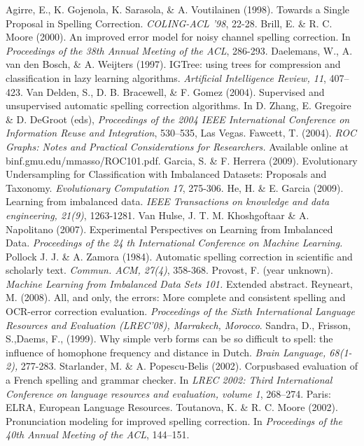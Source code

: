 \documentclass[12pt]{article}
\begin{document}
\begin{thebibliography}{99}

Agirre, E., K. Gojenola, K. Sarasola, \& A. Voutilainen (1998). Towards a Single Proposal in Spelling Correction. \emph{COLING-ACL ’98},  22-28.
Brill, E. \& R. C. Moore (2000). An improved error model for noisy channel spelling correction. In \emph{Proceedings of the 38th Annual Meeting of the ACL}, 286-293.
Daelemans, W., A. van den Bosch, \& A. Weijters (1997). IGTree: using trees for compression and classification in lazy learning algorithms. \emph{Artificial Intelligence Review, 11}, 407–423.
Van Delden, S., D. B. Bracewell, \& F. Gomez (2004). Supervised and unsupervised automatic spelling correction algorithms. In D. Zhang, E. Gregoire \& D. DeGroot (eds), \emph{Proceedings of the 2004 IEEE International Conference on Information Reuse and Integration}, 530–535, Las Vegas.
Fawcett, T. (2004). \emph{ROC Graphs: Notes and Practical Considerations for Researchers.} Available online at binf.gmu.edu/mmasso/ROC101.pdf.
Garcia, S. \& F. Herrera (2009). Evolutionary Undersampling for Classification with Imbalanced Datasets: Proposals and Taxonomy. \emph{Evolutionary Computation 17}, 275-306.
He, H. \& E. Garcia (2009). Learning from imbalanced data. \emph{IEEE Transactions on knowledge and data engineering, 21(9)}, 1263-1281.
Van Hulse, J. T. M. Khoshgoftaar \& A. Napolitano (2007). Experimental Perspectives on Learning from Imbalanced Data. \emph{Proceedings of the 24 th International Conference on Machine Learning.}
Pollock J. J. \& A. Zamora (1984). Automatic spelling correction in scientific and scholarly text. \emph{Commun. ACM, 27(4)}, 358-368.
Provost, F. (year unknown). \emph{Machine Learning from Imbalanced Data Sets 101.} Extended abstract.
Reyneart, M. (2008). All, and only, the errors: More complete and consistent spelling and OCR-error correction evaluation. \emph{Proceedings of the Sixth International Language Resources and Evaluation (LREC’08), Marrakech, Morocco}.
Sandra, D., Frisson, S.,Daems, F., (1999). Why simple verb forms can be so difficult to spell: the influence of homophone frequency and distance in Dutch. \emph{Brain Language, 68(1-2),} 277-283.
Starlander, M. \& A. Popescu-Belis (2002). Corpusbased evaluation of a French spelling and grammar checker. In \emph{LREC 2002: Third International Conference on language resources and evaluation, volume 1}, 268–274. Paris: ELRA, European Language Resources.
Toutanova, K. \& R. C. Moore (2002). Pronunciation modeling for improved spelling correction. In \emph{Proceedings of the 40th Annual Meeting of the ACL}, 144–151.

\end{thebibliography}

\end{document}
